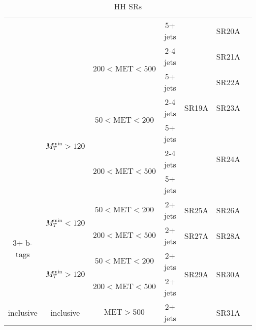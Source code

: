 \documentclass[plain,landscape]{article}
\begin{document}
\begin{table}
\begin{tabular}{|c|c|c|c|c|c|c|}
\cline{4-6}
& & & 5+ jets & \multirow{7}{*}{SR19A} & SR20A &  \\
\cline{3-4} \cline{6-6}
& &  \multirow{2}{*}{ $200 <  \textrm{MET} < 500$} &  2-4 jets & & SR21A & \\
\cline{4-4}  \cline{6-6}
& & & 5+ jets & & SR22A & \\
\cline{2-4} \cline{6-6}
& \multirow{4}{*}{$M_T^{\textrm{min}} > 120$}  & \multirow{2}{*}{ $50 < \textrm{MET} < 200$} & 2-4 jets & &  SR23A & \\
\cline{4-4} \cline{6-6}
& & & 5+ jets & & \multirow{3}{*}{SR24A} &  \\
\cline{3-4}
& &  \multirow{2}{*}{ $200 <  \textrm{MET} < 500$} &  2-4 jets & &  & \\
\cline{4-4} 
& & & 5+ jets & &  & \\
\cline{1-6}
\multirow{4}{*}{3+ b-tags} & \multirow{2}{*}{$M_T^{\textrm{min}} < 120$}  & $50 < \textrm{MET} < 200$ & 2+ jets & SR25A & SR26A & \\
\cline{3-6} 
& & $200 < \textrm{MET} < 500$ & 2+ jets & SR27A & SR28A & \\
\cline{2-6}
&  \multirow{2}{*}{$M_T^{\textrm{min}} > 120$}  & $50 < \textrm{MET} < 200$ & 2+ jets & \multirow{2}{*}{SR29A} & \multirow{2}{*}{SR30A} & \\
\cline{3-4} 
& & $200 < \textrm{MET} < 500$ & 2+ jets &  & &  \\
\hline
inclusive & inclusive & $\textrm{MET} > 500$ & 2+ jets & \cellcolor{black} & SR31A &  \\
\hline
\end{tabular}
\caption{HH SRs}
\end{table}
\end{document}
